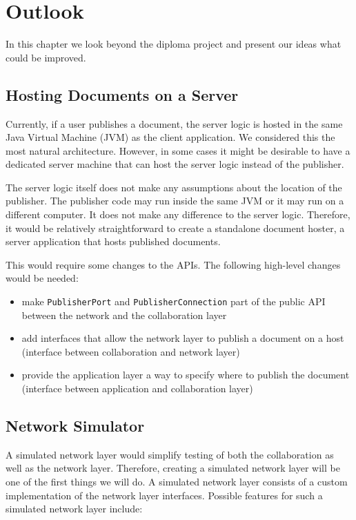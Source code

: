\chapter{Outlook}
\label{chapter:outlook}

In this chapter we look beyond the diploma project and present our ideas
what could be improved.



\section{Hosting Documents on a Server}
Currently, if a user publishes a document, the server logic is hosted
in the same Java Virtual Machine (JVM) as the client application. We considered
this the most natural architecture. However, in some cases it might be
desirable to have a dedicated server machine that can host the server
logic instead of the publisher.

The server logic itself does not make any assumptions about the location
of the publisher. The publisher code may run inside the same JVM or it may run
on a different computer. It does not make any difference to the server logic.
Therefore, it would be relatively straightforward to create a standalone
document hoster, a server application that hosts published documents.

This would require some changes to the APIs. The following high-level
changes would be needed:

\begin{itemize}
 \item make \texttt{PublisherPort} and \texttt{PublisherConnection} part of the public API between the network and the collaboration layer
 \item add interfaces that allow the network layer to publish a document on a host (interface between collaboration and network layer)
 \item provide the application layer a way to specify where to publish the document (interface between application and collaboration layer)
\end{itemize}



\section{Network Simulator}
A simulated network layer would simplify testing of both the collaboration as 
well as the network layer. Therefore, creating a simulated network layer
will be one of the first things we will do. A simulated network layer
consists of a custom implementation of the network layer interfaces. Possible 
features for such a simulated network layer include:

